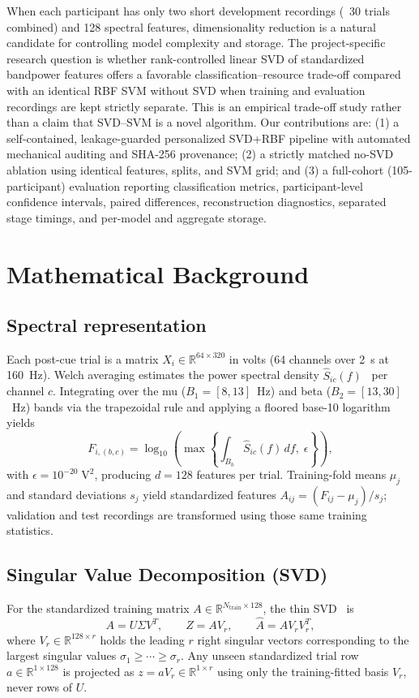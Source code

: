 \documentclass[conference]{IEEEtran}
\begin{document}
When each participant has only two short development recordings (~30 trials
combined) and 128 spectral features, dimensionality reduction is a natural
candidate for controlling model complexity and storage. The project-specific
research question is whether rank-controlled linear SVD of standardized bandpower
features offers a favorable classification--resource trade-off compared with an
identical RBF SVM without SVD when training and evaluation recordings are kept
strictly separate. This is an empirical trade-off study rather than a claim that
SVD--SVM is a novel algorithm. Our contributions are: (1) a self-contained,
leakage-guarded personalized SVD+RBF pipeline with automated mechanical auditing
and SHA-256 provenance; (2) a strictly matched no-SVD ablation using identical
features, splits, and SVM grid; and (3) a full-cohort (105-participant)
evaluation reporting classification metrics, participant-level confidence
intervals, paired differences, reconstruction diagnostics, separated stage
timings, and per-model and aggregate storage.

\section{Mathematical Background}
\subsection{Spectral representation}
Each post-cue trial is a matrix $X_i\in\mathbb{R}^{64\times 320}$ in volts
(64 channels over 2~s at 160~Hz). Welch averaging estimates the power spectral
density $\widehat S_{ic}(f)$~\cite{ref13} per channel $c$. Integrating over the
mu ($B_1=[8,13]$~Hz) and beta ($B_2=[13,30]$~Hz) bands via the trapezoidal rule
and applying a floored base-10 logarithm yields
\begin{equation}
F_{i,(b,c)}=\log_{10}\!\left(\max\left\{\int_{B_b}\widehat S_{ic}(f)\,df,\;\epsilon\right\}\right),
\end{equation}
with $\epsilon=10^{-20}\;\text{V}^2$, producing $d=128$ features per trial.
Training-fold means $\mu_j$ and standard deviations $s_j$ yield standardized
features $A_{ij}=(F_{ij}-\mu_j)/s_j$; validation and test recordings are
transformed using those same training statistics.

\subsection{Singular Value Decomposition (SVD)}
For the standardized training matrix $A\in\mathbb{R}^{N_{\text{train}}\times 128}$,
the thin SVD~\cite{ref10,ref11,ref12} is
\begin{equation}
A=U\Sigma V^T,\qquad Z=AV_r,\qquad \widehat A=AV_rV_r^T,
\end{equation}
where $V_r\in\mathbb{R}^{128\times r}$ holds the leading $r$ right singular
vectors corresponding to the largest singular values $\sigma_1\ge\cdots\ge\sigma_r$.
Any unseen standardized trial row $a\in\mathbb{R}^{1\times 128}$ is projected as
$z=aV_r\in\mathbb{R}^{1\times r}$ using only the training-fitted basis $V_r$,
never rows of $U$.
\end{document}

